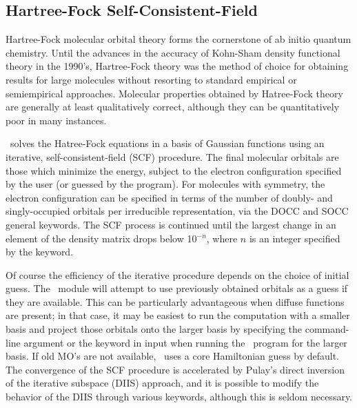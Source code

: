 \subsection{Hartree-Fock Self-Consistent-Field} \label{scf}
                                                                                
Hartree-Fock molecular orbital theory forms the cornerstone of
ab initio quantum chemistry.  Until the advances in the accuracy
of Kohn-Sham density functional theory in the 1990's, Hartree-Fock
theory was the method of choice for obtaining results for large
molecules without resorting to standard empirical or semiempirical
approaches.  Molecular properties obtained by Hatree-Fock theory are
generally at least qualitatively correct, although they can be
quantitatively poor in many instances.
                                                                                
\PSIfour\ solves the Hatree-Fock equations in a basis of Gaussian 
functions using an iterative, self-consistent-field (SCF) procedure.  The
final molecular orbitals are those which minimize the energy, 
subject to the electron configuration specified by the user (or
guessed by the program).  For molecules with symmetry, the 
electron configuration can be specified in terms of the number of
doubly- and singly-occupied orbitals per irreducible representation, 
via the DOCC and SOCC general keywords.
The SCF process is continued until the largest
change in an element of the density matrix drops below 10$^{-n}$, where
$n$ is an integer specified by the  keyword.

Of course the efficiency of the iterative procedure depends on the choice of
initial guess.  The \PSIscf\ module will attempt to use previously obtained
orbitals as a guess if they are available.  This can be particularly
advantageous when diffuse functions are present; in that case, it may
be easiest to run the computation with a smaller basis and project
those orbitals onto the larger basis by specifying the 
command-line argument or the  keyword in input
when running the \PSIinput\ program for the larger basis.  If
old MO's are not available, \PSIscf\ uses a core Hamiltonian guess
by default.  The convergence of the SCF procedure is accelerated by Pulay's 
direct inversion of the iterative subspace (DIIS)
approach,\cite{Pulay:1980} and it is possible
to modify the behavior of the DIIS through various keywords, 
although this is seldom necessary.  

